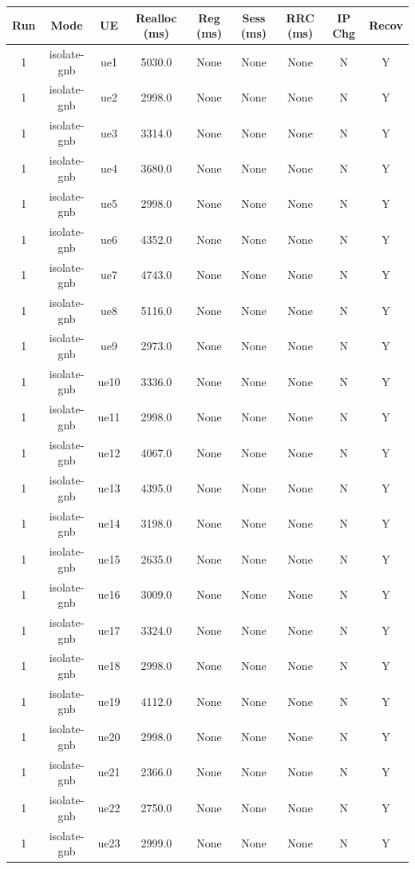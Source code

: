 \begin{table}[ht]
\centering
\begin{tabular}{|c|c|c|c|c|c|c|c|c|}
\hline
Run & Mode & UE & Realloc (ms) & Reg (ms) & Sess (ms) & RRC (ms) & IP Chg & Recov \\
\hline
1 & isolate-gnb & ue1 & 5030.0 & None & None & None & N & Y \\
1 & isolate-gnb & ue2 & 2998.0 & None & None & None & N & Y \\
1 & isolate-gnb & ue3 & 3314.0 & None & None & None & N & Y \\
1 & isolate-gnb & ue4 & 3680.0 & None & None & None & N & Y \\
1 & isolate-gnb & ue5 & 2998.0 & None & None & None & N & Y \\
1 & isolate-gnb & ue6 & 4352.0 & None & None & None & N & Y \\
1 & isolate-gnb & ue7 & 4743.0 & None & None & None & N & Y \\
1 & isolate-gnb & ue8 & 5116.0 & None & None & None & N & Y \\
1 & isolate-gnb & ue9 & 2973.0 & None & None & None & N & Y \\
1 & isolate-gnb & ue10 & 3336.0 & None & None & None & N & Y \\
1 & isolate-gnb & ue11 & 2998.0 & None & None & None & N & Y \\
1 & isolate-gnb & ue12 & 4067.0 & None & None & None & N & Y \\
1 & isolate-gnb & ue13 & 4395.0 & None & None & None & N & Y \\
1 & isolate-gnb & ue14 & 3198.0 & None & None & None & N & Y \\
1 & isolate-gnb & ue15 & 2635.0 & None & None & None & N & Y \\
1 & isolate-gnb & ue16 & 3009.0 & None & None & None & N & Y \\
1 & isolate-gnb & ue17 & 3324.0 & None & None & None & N & Y \\
1 & isolate-gnb & ue18 & 2998.0 & None & None & None & N & Y \\
1 & isolate-gnb & ue19 & 4112.0 & None & None & None & N & Y \\
1 & isolate-gnb & ue20 & 2998.0 & None & None & None & N & Y \\
1 & isolate-gnb & ue21 & 2366.0 & None & None & None & N & Y \\
1 & isolate-gnb & ue22 & 2750.0 & None & None & None & N & Y \\
1 & isolate-gnb & ue23 & 2999.0 & None & None & None & N & Y \\

\end{tabular}
\end{table}
